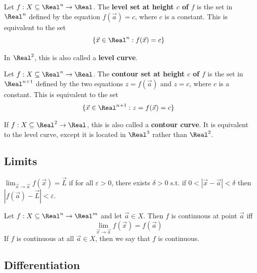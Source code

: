 \begin{definition}
  Let $f : X \subseteq \Real^n \to \Real$. The \textbf{level set at height $c$ of $f$} is the set in $\Real^n$ defined by the equation $f(\vec{a}) = c$, where $c$ is a constant. This is equivalent to the set
  \[
    \{ \vec{x} \in \Real^n : f(\vec{x}) = c \}
  \]

  In $\Real^2$, this is also called a \textbf{level curve}.
\end{definition}

\begin{definition}
  Let $f : X \subseteq \Real^n \to \Real$. The \textbf{contour set at height $c$ of $f$} is the set in $\Real^{n + 1}$ defined by the two equations $z = f(\vec{a})$ and $z = c$, where $c$ is a constant. This is equivalent to the set
  \[
    \{ \vec{x} \in \Real^{n + 1} : z = f(\vec{x}) = c \}
  \]

  If $f : X \subseteq \Real^2 \to \Real$, this is also called a \textbf{contour curve}. It is equivalent to the level curve, except it is located in $\Real^3$ rather than $\Real^2$.
\end{definition}


\subsection{Limits}


\begin{definition}[Limit]
  $\lim_{\vec{x} \to \vec{a}} f(\vec{x}) = \vec{L}$ if for all $\varepsilon > 0$, there exists $\delta > 0$ s.t. if $0 < |\vec{x} - \vec{a}| < \delta$ then $|f(\vec{a}) - \vec{L}| < \varepsilon$.
\end{definition}

\begin{definition}[Continuity]
  Let $f : X \subseteq \Real^n \to \Real^m$ and let $\vec{a} \in X$. Then $f$ is continuous at point $\vec{a}$ iff
  \[
    \lim_{\vec{x} \to \vec{a}} f(\vec{x}) = f(\vec{a})
  \]
  If $f$ is continuous at all $\vec{a} \in X$, then we say that $f$ is continuous.
\end{definition}

\subsection{Differentiation}


